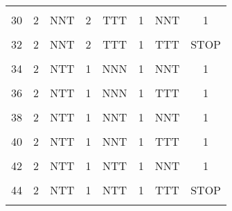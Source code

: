 \begin{table}[h!]
{\begin{tabular}[t]{cccccccc}
			\cellcolor{gray!6}{29} & \cellcolor{gray!6}{2} & \cellcolor{gray!6}{NNT} & \cellcolor{gray!6}{2} & \cellcolor{gray!6}{TTT} & \cellcolor{gray!6}{1} & \cellcolor{gray!6}{NNN} & \cellcolor{gray!6}{1}\\
			30 & 2 & NNT & 2 & TTT & 1 & NNT & 1\\
			\cellcolor{gray!6}{31} & \cellcolor{gray!6}{2} & \cellcolor{gray!6}{NNT} & \cellcolor{gray!6}{2} & \cellcolor{gray!6}{TTT} & \cellcolor{gray!6}{1} & \cellcolor{gray!6}{NTT} & \cellcolor{gray!6}{1}\\
			32 & 2 & NNT & 2 & TTT & 1 & TTT & STOP\\
			\cellcolor{gray!6}{33} & \cellcolor{gray!6}{2} & \cellcolor{gray!6}{NTT} & \cellcolor{gray!6}{1} & \cellcolor{gray!6}{NNN} & \cellcolor{gray!6}{1} & \cellcolor{gray!6}{NNN} & \cellcolor{gray!6}{2}\\
			34 & 2 & NTT & 1 & NNN & 1 & NNT & 1\\
			\cellcolor{gray!6}{35} & \cellcolor{gray!6}{2} & \cellcolor{gray!6}{NTT} & \cellcolor{gray!6}{1} & \cellcolor{gray!6}{NNN} & \cellcolor{gray!6}{1} & \cellcolor{gray!6}{NTT} & \cellcolor{gray!6}{1}\\
			36 & 2 & NTT & 1 & NNN & 1 & TTT & 1\\
			\cellcolor{gray!6}{37} & \cellcolor{gray!6}{2} & \cellcolor{gray!6}{NTT} & \cellcolor{gray!6}{1} & \cellcolor{gray!6}{NNT} & \cellcolor{gray!6}{1} & \cellcolor{gray!6}{NNN} & \cellcolor{gray!6}{1}\\
			38 & 2 & NTT & 1 & NNT & 1 & NNT & 1\\
			\cellcolor{gray!6}{39} & \cellcolor{gray!6}{2} & \cellcolor{gray!6}{NTT} & \cellcolor{gray!6}{1} & \cellcolor{gray!6}{NNT} & \cellcolor{gray!6}{1} & \cellcolor{gray!6}{NTT} & \cellcolor{gray!6}{1}\\
			40 & 2 & NTT & 1 & NNT & 1 & TTT & 1\\
			\cellcolor{gray!6}{41} & \cellcolor{gray!6}{2} & \cellcolor{gray!6}{NTT} & \cellcolor{gray!6}{1} & \cellcolor{gray!6}{NTT} & \cellcolor{gray!6}{1} & \cellcolor{gray!6}{NNN} & \cellcolor{gray!6}{1}\\
			42 & 2 & NTT & 1 & NTT & 1 & NNT & 1\\
			\cellcolor{gray!6}{43} & \cellcolor{gray!6}{2} & \cellcolor{gray!6}{NTT} & \cellcolor{gray!6}{1} & \cellcolor{gray!6}{NTT} & \cellcolor{gray!6}{1} & \cellcolor{gray!6}{NTT} & \cellcolor{gray!6}{1}\\
			44 & 2 & NTT & 1 & NTT & 1 & TTT & STOP\\
			\cellcolor{gray!6}{45} & \cellcolor{gray!6}{2} & \cellcolor{gray!6}{NTT} & \cellcolor{gray!6}{1} & \cellcolor{gray!6}{TTT} & \cellcolor{gray!6}{STOP} & \cellcolor{gray!6}{NA} & \cellcolor{gray!6}{STOP}\\

\end{tabular}}
\end{table}
